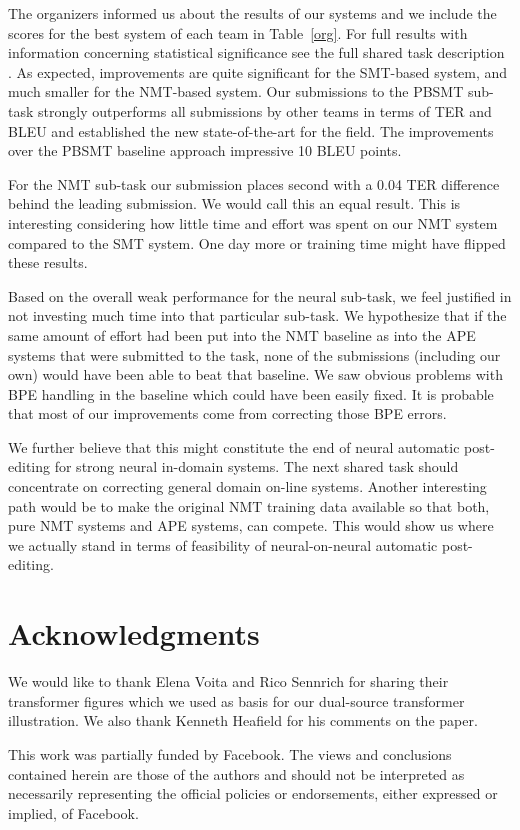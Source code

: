 \documentclass[11pt,a4paper]{article}
\begin{document}
The organizers informed us about the results of our systems and we include the scores for the best system of each team in Table~\ref{org}. For full results with information concerning statistical significance see the full shared task description \cite{chatterjee-EtAl:2018:WMTAPE}. As expected, improvements are quite significant for the SMT-based system, and much smaller for the NMT-based system. Our submissions to the PBSMT sub-task strongly outperforms all submissions by other teams in terms of TER and BLEU and established the new state-of-the-art for the field. The improvements over the PBSMT baseline approach impressive 10 BLEU points.

For the NMT sub-task our submission places second with a 0.04 TER difference behind the leading submission. We would call this an equal result. This is interesting considering how little time and effort was spent on our NMT system compared to the SMT system. One day more or training time might have flipped these results. 

Based on the overall weak performance for the neural sub-task, we feel justified in not investing much time into that particular sub-task. We hypothesize that if the same amount of effort had been put into the NMT baseline as into the APE systems that were submitted to the task, none of the submissions (including our own) would have been able to beat that baseline. We saw obvious problems with BPE handling in the baseline which could have been easily fixed. It is probable that most of our improvements come from correcting those BPE errors.

We further believe that this might constitute the end of neural automatic post-editing for strong neural in-domain systems. The next shared task should concentrate on correcting general domain on-line systems. Another interesting path would be to make the original NMT training data available so that both, pure NMT systems and APE systems, can compete. This would show us where we actually stand in terms of feasibility of neural-on-neural automatic post-editing.

\section*{Acknowledgments}

We would like to thank Elena Voita and Rico Sennrich for sharing their transformer figures which we used as basis for our dual-source transformer illustration. We also thank Kenneth Heafield for his comments on the paper.

This work was partially funded by Facebook. The views and conclusions contained herein are those of the authors and should not be interpreted as necessarily representing the official policies or endorsements, either expressed or implied, of Facebook.



\end{document}
